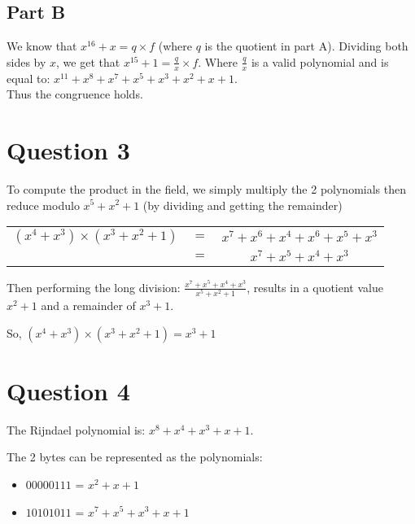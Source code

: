 \documentclass{article}
\makeatletter
\newcommand*{\currentname}{\TR@currentTitle}
\numberwithin{equation}{subsection}
\makeatother
\begin{document}
	\subsection*{Part B}
	We know that $x^{16}+x = q \times f$ (where $q$ is the quotient in part A). Dividing both sides by $x$,
	we get that $x^{15}+1 = \frac{q}{x} \times f$. Where $\frac{q}{x}$ is a valid polynomial and is equal to: 
	$x^{11}+x^8+x^7+x^5+x^3+x^2+x+1$.\\
	Thus the congruence holds.

	\newpage
	\thispagestyle{fancy}
 	\section*{Question 3}
	To compute the product in the field, we simply multiply the 2 polynomials then reduce modulo $x^5+x^2+1$ (by dividing
	and getting the remainder)

	\begin{center}
		\begin{tabular}{c c c}
			$(x^4+x^3) \times (x^3+x^2+1)$	&	$=$	&	$x^7+x^6+x^4+x^6+x^5+x^3$\\
																			&	$=$	&	$x^7+x^5+x^4+x^3$
		\end{tabular}
	\end{center}

	Then performing the long division: $\frac{x^7+x^5+x^4+x^3}{x^5+x^2+1}$, results in a quotient value $x^2+1$ and a 
	remainder of $x^3+1$.
	
	\vspace{15pt}
	
	So, $(x^4+x^3)\times (x^3+x^2+1) = x^3+1$

	\newpage
	\thispagestyle{fancy}
 	\section*{Question 4}
	The Rijndael polynomial is: $x^8+x^4+x^3+x+1$.

	The 2 bytes can be represented as the polynomials:
	\begin{itemize}
		\item $00000111$ = $x^2+x+1$
		\item $10101011$ = $x^7+x^5+x^3+x+1$
	\end{itemize}
	
\end{document}
